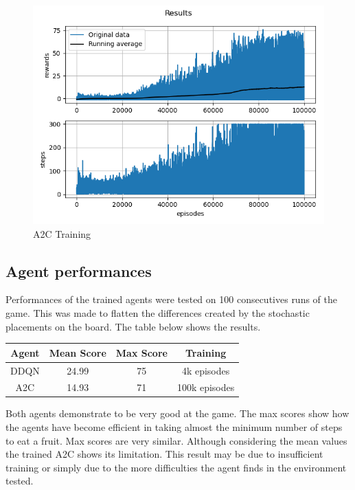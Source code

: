 \documentclass[conference]{IEEEtran}
\begin{document}
\begin{figure}[ht]
    \centering
    \includegraphics[scale=0.5]{training_snake_100000}
    \caption{A2C Training}
\end{figure}

\subsection{Agent performances}
Performances of the trained agents were tested on 100 consecutives runs of the game. This was made to flatten the differences created by the stochastic
placements on the board. The table below shows the results.

\begin{center}
    \begin{tabular}{| c | c | c | c |}
        \hline
        \textbf{Agent} & \textbf{Mean Score} & \textbf{Max Score} & \textbf{Training}\\
        \hline\hline
        DDQN & 24.99 & 75 & 4k episodes\\
        \hline
        A2C & 14.93 & 71 & 100k episodes\\
        \hline
    \end{tabular}
\end{center}

Both agents demonstrate to be very good at the game. The max scores show how the agents have become efficient in taking almost the minimum
number of steps to eat a fruit. Max scores are very similar. Although considering the mean values the trained A2C shows its limitation. This result
may be due to insufficient training or simply due to the more difficulties the agent finds in the environment tested.
\end{document}
